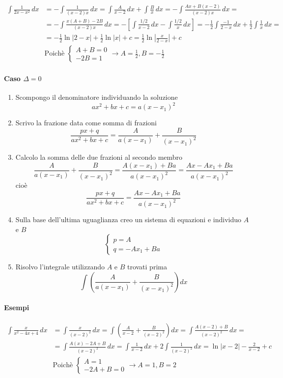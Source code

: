 \documentclass[11pt]{article}
\begin{document}
\begin{align*}\int \frac{1}{2x-x^2}\,dx&=-\int \frac{1}{(x-2)x}\,dx=\int \frac{A}{x-2}\,dx+\int \frac{B}{x}\,dx=-\int \frac{Ax+B(x-2)}{(x-2)x}\,dx=\\&=-\int \frac{x(A+B)-2B}{(x-2)x}\,dx=-\left[\int \frac{1/2}{x-2}\,dx-\int \frac{1/2}{x}\,dx\right]=-\frac{1}{2}\int \frac{-1}{2-x}\,dx+\frac{1}{2}\int \frac{1}{x}\,dx=\\&=-\frac{1}{2}\ln|2-x|+\frac{1}{2}\ln|x|+c=\frac{1}{2}\ln\left|\frac{x}{2-x}\right|+c\\&\text{Poichè }\begin{cases}A+B=0\\-2B=1\end{cases} \longrightarrow A=\frac{1}{2}, B=-\frac{1}{2}\end{align*}

\paragraph{Caso $\Delta = 0$}
\begin{enumerate}
	\item Scompongo il denominatore individuando la soluzione
	\[ax^2+bx+c=a(x-x_1)^2\]
	\item Scrivo la frazione data come somma di frazioni
	\[\frac{px+q}{ax^2+bx+c}=\frac{A}{a(x-x_1)}+\frac{B}{(x-x_1)^2}\]
	\item Calcolo la somma delle due frazioni al secondo membro
	\[\frac{A}{a(x-x_1)}+\frac{B}{(x-x_1)^2}=\frac{A(x-x_1)+Ba}{a(x-x_1)^2}=\frac{Ax-Ax_1+Ba}{a(x-x_1)^2}\]
	cioè 
	\[\frac{px+q}{ax^2+bx+c}=\frac{Ax-Ax_1+Ba}{a(x-x_1)^2}\]
	\item Sulla base dell'ultima uguaglianza creo un sistema di equazioni e individuo $A$ e $B$
	\[\begin{cases}p=A\\q=-Ax_1+Ba\end{cases}\]
	\item Risolvo l'integrale utilizzando $A$ e $B$ trovati prima
	\[\int\left(\frac{A}{a(x-x_1)}+\frac{B}{(x-x_1)^2}\right)dx\]
\end{enumerate}
\paragraph{Esempi}
\begin{align*}
	\int \frac{x}{x^2-4x+4}\,dx&=\int \frac{x}{(x-2)^2}\,dx=\int \left(\frac{A}{x-2}+\frac{B}{(x-2)^2}\right)dx=\int \frac{A(x-2)+B}{(x-2)^2}\,dx=\\&=\int \frac{A(x)-2A+B}{(x-2)^2}\,dx=\int \frac{1}{x-2}\,dx+2\int \frac{1}{(x-2)^2}\,dx=\ln|x-2|-\frac{2}{x-2}+c\\&\text{Poichè }\begin{cases}A=1\\-2A+B=0\end{cases}\longrightarrow A=1, B=2\end{align*}
\end{document}
